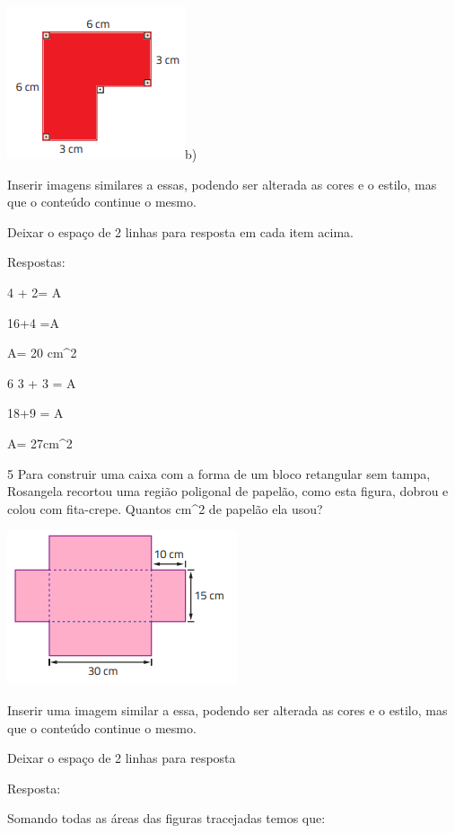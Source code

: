 \includegraphics[width=1\times 50833in,height=1\times 28681in]{./imgSAEB_8_MAT/media/image44.png}b)

Inserir imagens similares a essas, podendo ser alterada as cores e o
estilo, mas que o conteúdo continue o mesmo.

Deixar o espaço de 2 linhas para resposta em cada item acima.

Respostas:

\item 

4 + 2= A

16+4 =A

A= 20 cm^2

\item 

\num{6} 3 + 3 = A

18+9 = A

A= 27cm^2

\num{5} Para construir uma caixa com a forma de um bloco retangular sem
tampa, Rosangela recortou uma região poligonal de papelão, como esta
figura, dobrou e colou com fita-crepe. Quantos cm^2 de papelão ela usou?

\includegraphics[width=1\times 98333in,height=1\times 33255in]{./imgSAEB_8_MAT/media/image45.png}

Inserir uma imagem similar a essa, podendo ser alterada as cores e o
estilo, mas que o conteúdo continue o mesmo.

Deixar o espaço de 2 linhas para resposta

Resposta:

Somando todas as áreas das figuras tracejadas temos que:

